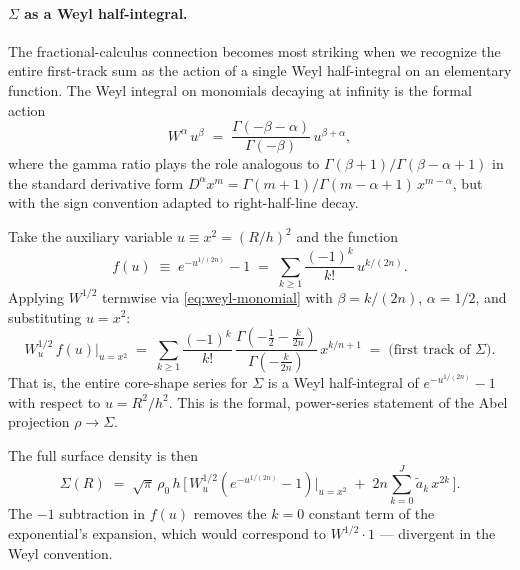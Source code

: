 \documentclass{article}
\begin{document}
\paragraph{\texorpdfstring{$\Sigma$ as a Weyl half-integral.}{Sigma as a Weyl half-integral.}}
The fractional-calculus connection becomes most striking when we recognize
the entire first-track sum as the action of a single Weyl half-integral on
an elementary function.  The Weyl integral on monomials decaying at infinity
is the formal action
\begin{equation}\label{eq:weyl-monomial}
W^{\alpha}\, u^{\beta}
\;=\;\frac{\Gamma(-\beta-\alpha)}{\Gamma(-\beta)}\,u^{\beta+\alpha},
\end{equation}
where the gamma ratio plays the role analogous to
$\Gamma(\beta+1)/\Gamma(\beta-\alpha+1)$ in the standard derivative form
$D^{\alpha}x^m=\Gamma(m+1)/\Gamma(m-\alpha+1)\,x^{m-\alpha}$, but with the
sign convention adapted to right-half-line decay.

Take the auxiliary variable $u\equiv x^2 = (R/h)^2$ and the function
\begin{equation}\label{eq:f-def}
f(u)\;\equiv\;e^{-u^{1/(2n)}}-1
\;=\;\sum_{k\ge1}\frac{(-1)^k}{k!}\,u^{k/(2n)}.
\end{equation}
Applying $W^{1/2}$ termwise via \eqref{eq:weyl-monomial} with $\beta=k/(2n)$,
$\alpha=1/2$, and substituting $u=x^2$:
\begin{equation}\label{eq:Sigma-weyl}
\boxed{\;
W^{1/2}_u\,f(u)\Big|_{u=x^2}
\;=\;\sum_{k\ge1}\frac{(-1)^k}{k!}\,
\frac{\Gamma(-\tfrac{1}{2}-\tfrac{k}{2n})}{\Gamma(-\tfrac{k}{2n})}\,x^{k/n+1}
\;=\;\text{(first track of }\Sigma\text{)}.
\;}
\end{equation}
That is, the entire core-shape series for $\Sigma$ is a Weyl half-integral of
$e^{-u^{1/(2n)}}-1$ with respect to $u=R^2/h^2$.  This is the formal,
power-series statement of the Abel projection $\rho\to\Sigma$.

The full surface density is then
\begin{equation}\label{eq:Sigma-frac}
\Sigma(R)\;=\;\sqrt\pi\,\rho_0\,h\,\bigg[\,
W^{1/2}_u\!\left(e^{-u^{1/(2n)}}-1\right)\Big|_{u=x^2}
\;+\;2n\sum_{k=0}^{J}\tilde a_k\,x^{2k}
\,\bigg].
\end{equation}
The $-1$ subtraction in $f(u)$ removes the $k=0$ constant term of the
exponential's expansion, which would correspond to $W^{1/2}\!\cdot\!1$ ---
divergent in the Weyl convention.
\end{document}
